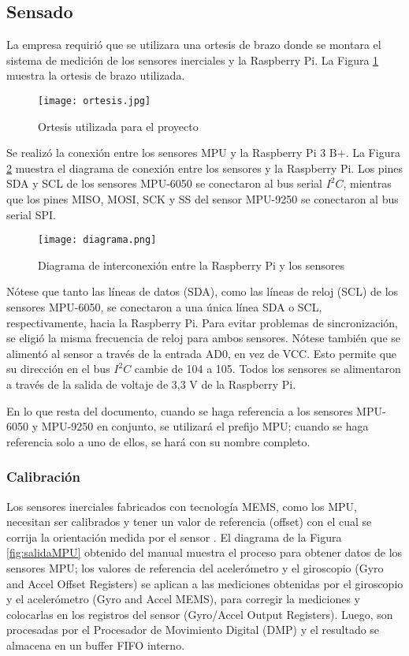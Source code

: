 \subsection{Sensado}

La empresa requirió que se utilizara una ortesis de brazo donde se montara el sistema de medición de los sensores inerciales y la Raspberry Pi. La Figura \ref{fig:ortesis} muestra la ortesis de brazo utilizada.

\begin{figure}[htb]
	\centering
	\texttt{[image: ortesis.jpg]}
	\caption{Ortesis utilizada para el proyecto}
	\label{fig:ortesis}
\end{figure}

Se realizó la conexión entre los sensores MPU y la Raspberry Pi 3 B+. La Figura \ref{fig:diagrama} muestra el diagrama de conexión entre los sensores y la Raspberry Pi. Los pines SDA y SCL de los sensores MPU-6050 se conectaron al bus serial $I^2C$, mientras que los pines MISO, MOSI, SCK y SS del sensor MPU-9250 se conectaron al bus serial SPI.

\begin{figure}[htb]
	\centering
	\texttt{[image: diagrama.png]}
	\caption{Diagrama de interconexión entre la Raspberry Pi y los sensores}
	\label{fig:diagrama}
\end{figure}

Nótese que tanto las líneas de datos (SDA), como las líneas de reloj (SCL) de los sensores MPU-6050, se conectaron a una única línea SDA o SCL, respectivamente, hacia la Raspberry Pi. Para evitar problemas de sincronización, se eligió la misma frecuencia de reloj para ambos sensores. Nótese también que se alimentó al sensor a través de la entrada AD0, en vez de VCC. Esto permite que su dirección en el bus $I^2C$ cambie de 104 a 105. Todos los sensores se alimentaron a través de la salida de voltaje de 3,3 V de la Raspberry Pi.

En lo que resta del documento, cuando se haga referencia a los sensores MPU-6050 y MPU-9250 en conjunto, se utilizará el prefijo MPU; cuando se haga referencia solo a uno de ellos, se hará con su nombre completo.

\subsubsection{Calibración}

Los sensores inerciales fabricados con tecnología MEMS, como los MPU, necesitan ser calibrados y tener un valor de referencia (offset) con el cual se corrija la orientación medida por el sensor \cite{offsetMPU}. El diagrama de la Figura \ref{fig:salidaMPU} obtenido del manual \cite{offsetMPU} muestra el proceso para obtener datos de los sensores MPU; los valores de referencia del acelerómetro y el giroscopio (Gyro and Accel Offset Registers) se aplican a las mediciones obtenidas por el giroscopio y el acelerómetro (Gyro and Accel MEMS), para corregir la mediciones y colocarlas en los registros del sensor (Gyro/Accel Output Registers). Luego, son procesadas por el Procesador de Movimiento Digital (DMP) y el resultado se almacena en un buffer FIFO interno.

